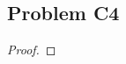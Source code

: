 \documentclass[../../../main.tex]{subfiles}
\begin{document}
\subsection{Problem C4}
\begin{wts}

\end{wts}
\begin{proof}

\end{proof}
\end{document}

